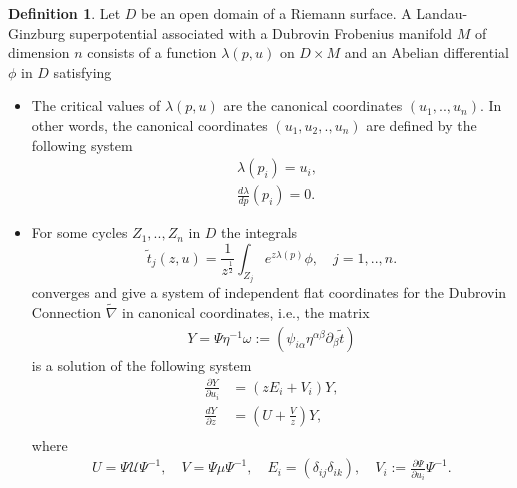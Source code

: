 \documentclass{article}
\theoremstyle{definition}
\newtheorem{definition}{Definition}[section]
\begin{document}
\begin{definition}\label{Landau-Ginzburg superpotential definition}\cite{B. Dubrovin3}
Let $D$ be an open domain of a Riemann surface. A Landau-Ginzburg superpotential associated with a Dubrovin Frobenius manifold $M$ of dimension $n$ consists of a function $\lambda(p,u)$ on $D \times M$ and an Abelian differential $\phi$ in $D$ satisfying
\begin{itemize}
\item The critical values of  $\lambda(p,u)$ are the canonical coordinates $(u_1,..,u_n)$. In other words, the canonical coordinates $(u_1,u_2,. ,u_n)$ are defined by the following system
\begin{equation*}
\begin{split}
&\lambda(p_i)=u_i,\\
&\frac{d \lambda}{dp}\left( p_i\right)=0.
\end{split}
\end{equation*}
\item For some cycles $Z_1,..,Z_n$ in $D$ the integrals 
\begin{equation}\label{Mirror symmetry}
\tilde t_j(z,u)=\frac{1}{z^{\frac{1}{2}}}\int_{Z_j} e^{z\lambda(p)}\phi, \quad j=1,..,n.
\end{equation}
converges and give a system of independent flat coordinates for the Dubrovin Connection $\tilde\nabla$ in canonical coordinates, i.e., the matrix
\begin{equation*}
\begin{split}
Y=\Psi\eta^{-1}\omega:=\left(\psi_{i\alpha}\eta^{\alpha\beta}\partial_{\beta}\tilde t   \right)
\end{split}
\end{equation*}
is a solution of the following system
\begin{equation}\label{Dubrovin connection in canonical coordinates 1}
\begin{split}
\frac{\partial Y}{\partial u_i}&=\left( zE_i+V_i \right)Y,\\
\frac{dY}{\partial z}&=\left( U+\frac{V}{z} \right)Y,\\
\end{split}
\end{equation}
where 
\begin{equation}\label{U,V, Vi in canonical coordinates}
\begin{split}
U=\Psi\mathcal{U}\Psi^{-1}, \quad V=\Psi\mu\Psi^{-1}, \quad E_i=\left( \delta_{ij}\delta_{ik}  \right), \quad V_i:=\frac{\partial \Psi}{\partial u_i}\Psi^{-1}.
\end{split}
\end{equation}


\end{itemize}
\end{definition}
\end{document}
